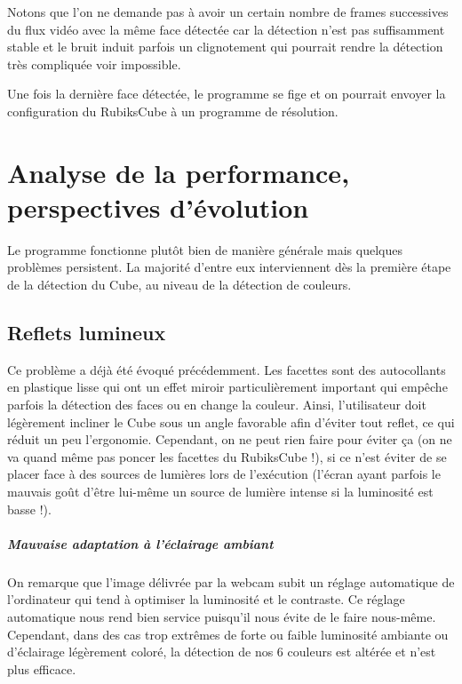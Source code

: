 \documentclass[a4paper,11pt]{article}
\begin{document}
Notons que l'on ne demande pas à avoir un certain nombre de frames successives du flux vidéo avec la même face
détectée car la détection n'est pas suffisamment stable et le bruit induit parfois un clignotement qui
pourrait rendre la détection très compliquée voir impossible.

Une fois la dernière face détectée, le programme se fige et on pourrait envoyer la configuration du RubiksCube
à un programme de résolution.

\section{Analyse de la performance, perspectives d'évolution}
Le programme fonctionne plutôt bien de manière générale mais quelques problèmes persistent. La majorité d'entre
eux interviennent dès la première étape de la détection du Cube, au niveau de la détection de couleurs.

\subsection{Reflets lumineux} 
Ce problème a déjà été évoqué précédemment. Les facettes sont des autocollants en plastique lisse qui ont un
effet miroir particulièrement important qui empêche parfois la détection des faces ou en change la couleur.
Ainsi, l'utilisateur doit légèrement incliner le Cube sous un angle favorable afin d'éviter tout reflet, ce
qui réduit un peu l'ergonomie. Cependant, on ne peut rien faire pour éviter ça (on ne va quand même pas poncer
les facettes du RubiksCube !), si ce n'est éviter de se placer face à des sources de lumières lors de l'exécution
(l'écran ayant parfois le mauvais goût d'être lui-même un source de lumière intense si la luminosité est basse !).

\subparagraph{Mauvaise adaptation à l'éclairage ambiant}
On remarque que l'image délivrée par la webcam subit un réglage automatique de l'ordinateur qui tend à optimiser
la luminosité et le contraste. Ce réglage automatique nous rend bien service puisqu'il nous évite de le faire 
nous-même. Cependant, dans des cas trop extrêmes de forte ou faible luminosité ambiante ou d'éclairage 
légèrement coloré, la détection de nos 6 couleurs est altérée et n'est plus efficace.
\end{document}
